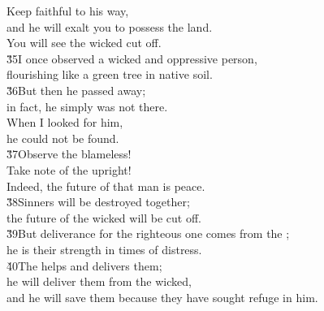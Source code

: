 \begin{poetry}
\poemll    Keep faithful to his way, \\
\poemlll       and he will exalt you to possess the land. \\
\poeml You will see the wicked cut off. \\
\poeml \v{35}I once observed a wicked and oppressive person, \\
\poemll    flourishing like a green tree in native soil. \\
\poeml \v{36}But then he passed away; \\
\poemll    in fact, he simply was not there. \\
\poeml When I looked for him, \\
\poemll    he could not be found. \\
\poeml \v{37}Observe the blameless! \\
\poemll    Take note of the upright! \\
\poemlll       Indeed, the future of that man is peace. \\
\poeml \v{38}Sinners will be destroyed together; \\
\poemll    the future of the wicked will be cut off. \\
\poeml \v{39}But deliverance for the righteous one comes from the ; \\
\poemll    he is their strength in times of distress. \\
\poeml \v{40}The  helps and delivers them; \\
\poemll    he will deliver them from the wicked, \\
\poemlll       and he will save them because they have sought refuge in him.
\end{poetry}

